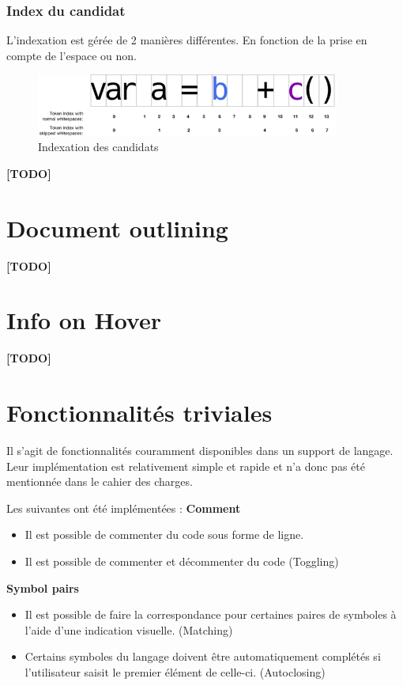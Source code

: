 \documentclass[
    iict, %
    il, %
]{heig-tb}
\begin{document}
\subsubsection{Index du candidat}
L’indexation est gérée de 2 manières différentes. En fonction de la prise en compte de l’espace ou non.

\begin{figure}[!ht]
    \begin{center}
        \includegraphics[width=10cm]{assets/figures/candidat-index.png}
    \end{center}
    \caption[Indexation des candidats]{\label{candidat-index} Indexation des candidats}
\end{figure}

\textbf{[TODO]}

\section{Document outlining}
\textbf{[TODO]}

\section{Info on Hover}
\textbf{[TODO]}

\section{Fonctionnalités triviales}
Il s’agit de fonctionnalités couramment disponibles dans un support de langage. Leur implémentation est relativement simple et rapide et n’a donc pas été mentionnée dans le cahier des charges.

Les suivantes ont été implémentées :
\textbf{Comment}
\begin{itemize}
    \item Il est possible de commenter du code sous forme de ligne.
    \item Il est possible de commenter et décommenter du code (Toggling)
\end{itemize}

\textbf{Symbol pairs}
\begin{itemize}
    \item Il est possible de faire la correspondance pour certaines paires de symboles à l’aide d’une indication visuelle. (Matching)
    \item Certains symboles du langage doivent être automatiquement complétés si l’utilisateur saisit le premier élément de celle-ci. (Autoclosing)
\end{itemize}
\end{document}
